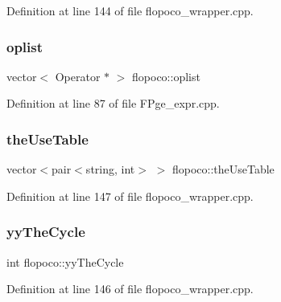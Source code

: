 Definition at line 144 of file flopoco\+\_\+wrapper.\+cpp.

\mbox{\label{namespaceflopoco_a7b47e1bd087ebaa2cfe3b19d485ac16b}} 
\subsubsection{\texorpdfstring{oplist}{oplist}}
{\footnotesize\ttfamily vector$<$ Operator $\ast$ $>$ flopoco\+::oplist}



Definition at line 87 of file F\+Pge\+\_\+expr.\+cpp.

\mbox{\label{namespaceflopoco_ada22628e014742301d4944e1b54aaa73}} 
\subsubsection{\texorpdfstring{the\+Use\+Table}{theUseTable}}
{\footnotesize\ttfamily vector$<$pair$<$string, int$>$ $>$ flopoco\+::the\+Use\+Table}



Definition at line 147 of file flopoco\+\_\+wrapper.\+cpp.

\mbox{\label{namespaceflopoco_a9b076879d9e99dc16fb742bd751cb684}} 
\subsubsection{\texorpdfstring{yy\+The\+Cycle}{yyTheCycle}}
{\footnotesize\ttfamily int flopoco\+::yy\+The\+Cycle}



Definition at line 146 of file flopoco\+\_\+wrapper.\+cpp.

